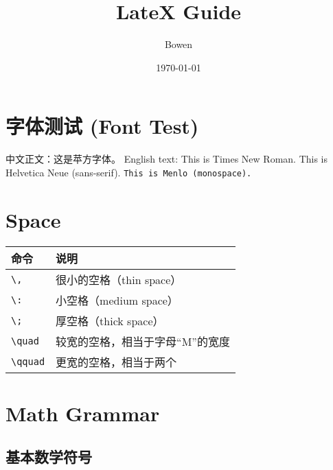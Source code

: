 \documentclass[a4paper,12pt]{article}
\begin{document}
    \title{LateX Guide}
    \author{Bowen}
    \date{\today}
    \maketitle
    \section*{字体测试 (Font Test)}
    中文正文：这是苹方字体。
    English text: This is Times New Roman.
    \textsf{This is Helvetica Neue (sans-serif).}
    \texttt{This is Menlo (monospace).}



    \section{Space}

    \begin{tabular}{ll}
        \toprule
        \textbf{命令}   & \textbf{说明}       \\
        \midrule
        \verb|\,|     & 很小的空格（thin space） \\
        \verb|\:|     & 小空格（medium space） \\
        \verb|\;|     & 厚空格（thick space）  \\
        \verb|\quad|  & 较宽的空格，相当于字母“M”的宽度 \\
        \verb|\qquad| & 更宽的空格，相当于两个 \quad \\
    \end{tabular}



    \section{Math Grammar}

    \subsection{基本数学符号}
\end{document}
